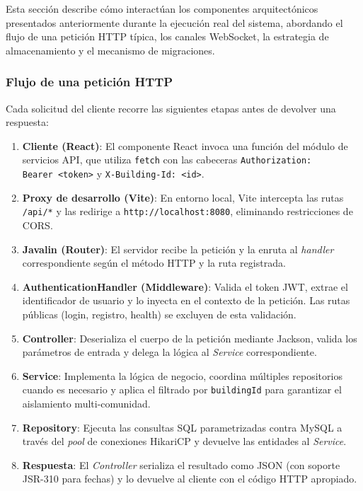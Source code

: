 Esta sección describe cómo interactúan los componentes arquitectónicos presentados anteriormente durante la ejecución real del sistema, abordando el flujo de una petición HTTP típica, los canales WebSocket, la estrategia de almacenamiento y el mecanismo de migraciones.

\subsubsection*{Flujo de una petición HTTP}

Cada solicitud del cliente recorre las siguientes etapas antes de devolver una respuesta:

\begin{enumerate}
    \item \textbf{Cliente (React)}: El componente React invoca una función del módulo de servicios API, que utiliza \texttt{fetch} con las cabeceras \texttt{Authorization: Bearer~<token>} y \texttt{X-Building-Id:~<id>}.
    \item \textbf{Proxy de desarrollo (Vite)}: En entorno local, Vite intercepta las rutas \texttt{/api/*} y las redirige a \texttt{http://localhost:8080}, eliminando restricciones de CORS.
    \item \textbf{Javalin (Router)}: El servidor recibe la petición y la enruta al \textit{handler} correspondiente según el método HTTP y la ruta registrada.
    \item \textbf{AuthenticationHandler (Middleware)}: Valida el token JWT, extrae el identificador de usuario y lo inyecta en el contexto de la petición. Las rutas públicas (login, registro, health) se excluyen de esta validación.
    \item \textbf{Controller}: Deserializa el cuerpo de la petición mediante Jackson, valida los parámetros de entrada y delega la lógica al \textit{Service} correspondiente.
    \item \textbf{Service}: Implementa la lógica de negocio, coordina múltiples repositorios cuando es necesario y aplica el filtrado por \texttt{buildingId} para garantizar el aislamiento multi-comunidad.
    \item \textbf{Repository}: Ejecuta las consultas SQL parametrizadas contra MySQL a través del \textit{pool} de conexiones HikariCP y devuelve las entidades al \textit{Service}.
    \item \textbf{Respuesta}: El \textit{Controller} serializa el resultado como JSON (con soporte JSR-310 para fechas) y lo devuelve al cliente con el código HTTP apropiado.
\end{enumerate}

